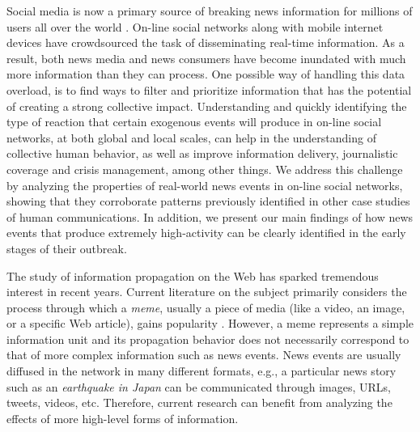 \documentclass[10pt,letterpaper]{article}
\begin{document}
Social media is now a primary source of breaking news information
for millions of users all over the world \cite{Kwak:2010}. On-line
social networks along with mobile internet devices have crowdsourced
the task of disseminating real-time information. As a result, both
news media and news consumers have become inundated with much more
information than they can process. One possible way of handling this data overload, is
to find ways to filter and prioritize information that has the
potential of creating a strong collective impact. Understanding and
quickly identifying the type of reaction that certain exogenous events will produce
in on-line social networks, at both global and local scales, can help
in the understanding of collective human behavior, as well as
improve information delivery, journalistic coverage and
crisis management, among other things. We
address this challenge by analyzing the properties of real-world news
events in on-line social networks, showing that they corroborate patterns
previously identified in other case studies of human communications. In
addition, we present our main findings of how news events that produce
extremely high-activity can be clearly identified in the early stages of
their outbreak.


The study of information propagation on the Web has sparked tremendous
interest in recent years. Current literature on the subject primarily
considers the process through which a {\em meme}, usually a piece of
media (like a video, an image, or a specific Web article), gains
popularity
\cite{Castillo:2014,Szabo:2010,Lerman:2010,Tatar2014,Pinto:2013,Ahmed:2013,Li:2016:concept:drift,
Liu:2015:UN}.  
However, a meme represents a
simple information unit and its propagation behavior does not necessarily
correspond to that of more complex information such as
news events. News events are usually diffused in the network in many
different formats, e.g., a particular news story such as an {\em
  earthquake in Japan} can be communicated through images, URLs,
tweets, videos, etc. Therefore, current research can benefit from analyzing
the effects of more high-level forms of information. 
\end{document}
